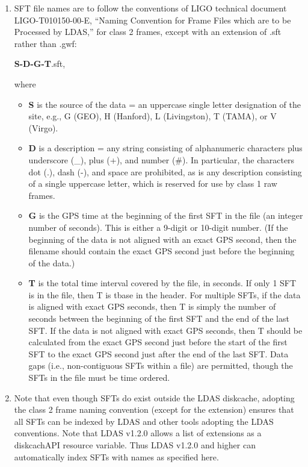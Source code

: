 \documentclass{ligodcc}
\begin{document}
\begin{enumerate}
\item SFT file names are to follow the conventions of LIGO technical
document LIGO-T010150-00-E, ``Naming Convention for Frame Files which are
to be Processed by LDAS,'' for class 2 frames, except with an extension
of .sft rather than .gwf:

{\bf S-D-G-T}.sft,

where
\begin{itemize}
\item {\bf S} is the source of the data = an uppercase single letter designation of
the site, e.g., G (GEO), H (Hanford), L (Livingston), T (TAMA), or V
(Virgo).

\item {\bf D} is a description = any string consisting of alphanumeric characters
plus underscore (\_), plus (+), and number (\#). In particular, the
characters dot (.), dash (-), and space are prohibited, as is any
description consisting of a single uppercase letter, which is reserved
for use by class 1 raw frames.

\item {\bf G} is the GPS time at the beginning of the first SFT in the file (an
integer number of seconds). This is either a 9-digit or 10-digit number.
(If the beginning of the data is not aligned with an exact GPS second,
then the filename should contain the exact GPS second just before the
beginning of the data.)

\item {\bf T} is the total time interval covered by the file, in seconds.  If only 1
SFT is in the file, then T is tbase in the header.  For multiple SFTs,
if the data is aligned with exact GPS seconds, then T is simply the
number of seconds between the beginning of the first SFT and the end of
the last SFT. If the data is not aligned with exact GPS seconds, then T
should be calculated from the exact GPS second just before the start of
the first SFT to the exact GPS second just after the end of the last
SFT. Data gaps (i.e., non-contiguous SFTs within a file) are permitted,
though the SFTs in the file must be time ordered.
\end{itemize}

\item Note that even though SFTs do exist outside the LDAS diskcache,
adopting the class 2 frame naming convention (except for the extension)
ensures that all SFTs can be indexed by LDAS and other tools adopting
the LDAS conventions. Note that LDAS v1.2.0 allows a list of extensions
as a diskcachAPI resource variable. Thus LDAS v1.2.0 and higher can
automatically index SFTs with names as specified here.


\end{enumerate}
\end{document}
